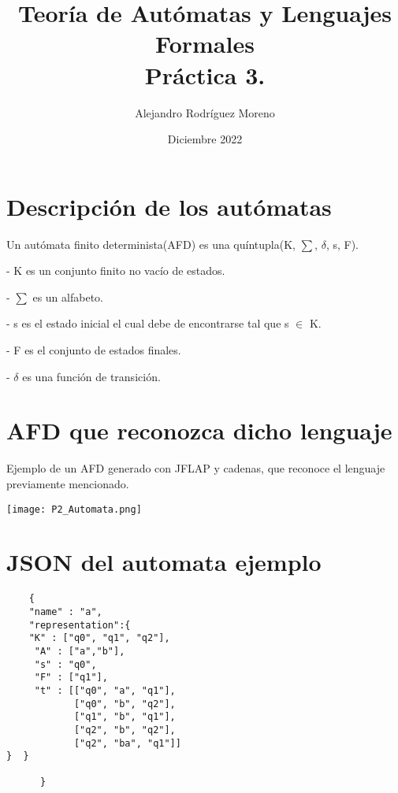\documentclass{article}
\title{Teoría de Autómatas y Lenguajes Formales\\[.4\baselineskip]Práctica 3.}
\author{Alejandro Rodríguez Moreno}
\date{Diciembre 2022}
\theoremstyle{plain}
\theoremstyle{definition}
\begin{document}
\maketitle

\section{Descripción de los autómatas}

Un autómata finito determinista(AFD) es una quíntupla(K, $\sum$, $\delta$, s, F).

\vspace{6mm}

- K es un conjunto finito no vacío de estados.

\vspace{4mm}

- $\sum$ es un alfabeto.

\vspace{4mm}

- s es el estado inicial el cual debe de encontrarse tal que s $\in$ K.

\vspace{4mm}

- F es el conjunto de estados finales.

\vspace{4mm}

- $\delta$ es una función de transición.

\newpage
\section{AFD que reconozca dicho lenguaje}
Ejemplo de un AFD generado con JFLAP y cadenas, que reconoce el lenguaje previamente mencionado.

\begin{center} 
\texttt{[image: P2\_Automata.png]}
\end{center}

\section{JSON del automata ejemplo}

\begin{verbatim}
    {
    "name" : "a",
    "representation":{
    "K" : ["q0", "q1", "q2"],
     "A" : ["a","b"],
     "s" : "q0",
     "F" : ["q1"],
     "t" : [["q0", "a", "q1"],
            ["q0", "b", "q2"],
            ["q1", "b", "q1"],
            ["q2", "b", "q2"],
            ["q2", "ba", "q1"]]
}  }
            
      }
\end{verbatim}
\end{document}

